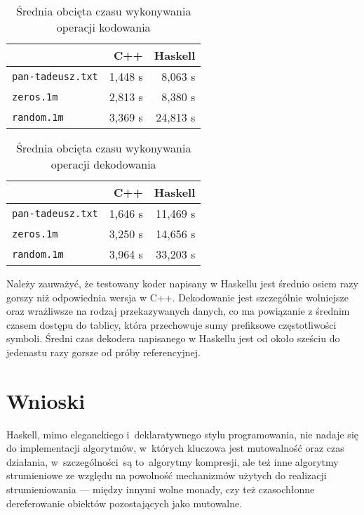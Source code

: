 \documentclass[../../thesis.tex]{subfiles}
\begin{document}
\begin{table}[h]
  \label{tab:encode-time}
  \caption{Średnia obcięta czasu wykonywania operacji kodowania}
  \centering
  \begin{tabular}{| l | r | r |}
    \hline
    & C++ & Haskell \\ \hline
    \texttt{pan-tadeusz.txt} & 1,448 s & 8,063 s\\ \hline
    \texttt{zeros.1m} & 2,813 s & 8,380 s\\ \hline
    \texttt{random.1m} & 3,369 s & 24,813 s\\ \hline
  \end{tabular}
\end{table}

\begin{table}[h]
  \label{tab:decode-time}
  \caption{Średnia obcięta czasu wykonywania operacji dekodowania}
  \centering
  \begin{tabular}{| l | r | r |}
    \hline
    & C++ & Haskell \\ \hline
    \texttt{pan-tadeusz.txt} & 1,646 s & 11,469 s \\ \hline
    \texttt{zeros.1m} & 3,250 s & 14,656 s\\ \hline
    \texttt{random.1m} & 3,964 s & 33,203 s\\ \hline
  \end{tabular}
\end{table}

Należy zauważyć, że testowany koder napisany w Haskellu
jest średnio osiem razy gorszy niż odpowiednia wersja w C++.
Dekodowanie jest szczególnie wolniejsze oraz wrażliwsze 
na rodzaj przekazywanych danych, co ma powiązanie z 
średnim czasem dostępu do tablicy, która przechowuje
sumy prefiksowe częstotliwości symboli. Średni czas
dekodera napisanego w Haskellu jest od około sześciu 
do jedenastu razy gorsze od próby referencyjnej.

\section{Wnioski}

Haskell, mimo eleganckiego i~deklaratywnego stylu programowania,
nie nadaje się do implementacji algorytmów, w~których kluczowa
jest mutowalność oraz czas działania, w~szczególności~są to~algorytmy
kompresji, ale też inne algorytmy strumieniowe ze względu na powolność
mechanizmów użytych do realizacji strumieniowania --- między innymi
wolne monady, czy też czasochłonne dereferowanie obiektów pozostających
jako mutowalne. 
\end{document}
